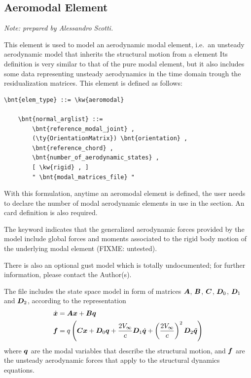 \subsection{Aeromodal Element}
\emph{Note: prepared by Alessandro Scotti.}

\noindent
This element is used to model an aerodynamic modal element,
i.e.\ an unsteady aerodynamic model that inherits the structural 
motion from a   element
Its definition is very similar to that of the pure modal element, 
but it also includes some data representing unsteady aerodynamics 
in the time domain trough the residualization matrices.
This element is defined as follows:
\begin{Verbatim}[commandchars=\\\{\}]
    \bnt{elem_type} ::= \kw{aeromodal}

    \bnt{normal_arglist} ::= 
        \bnt{reference_modal_joint} ,
        (\ty{OrientationMatrix}) \bnt{orientation} ,
        \bnt{reference_chord} ,
        \bnt{number_of_aerodynamic_states} ,
        [ \kw{rigid} , ]
        " \bnt{modal_matrices_file} "
\end{Verbatim}
With this formulation, anytime an aeromodal element is defined, 
the user needs to declare the number of modal aerodynamic elements 
in use in the  section.
An 
card definition is also required.

The keyword  indicates that the generalized aerodynamic forces
provided by the model include global forces and moments associated 
to the rigid body motion of the underlying modal element (FIXME: untested).

There is also an optional gust model which is totally undocumented;
for further information, please contact the Author(s).

The  file includes the state space model in form 
of matrices $\boldsymbol{A}$, $\boldsymbol{B}$, $\boldsymbol{C}$, $\boldsymbol{D}_0$, $\boldsymbol{D}_1$ and $\boldsymbol{D}_2$,
according to the representation
\begin{align*}
	\dot{\boldsymbol{x}} &= \boldsymbol{A}\boldsymbol{x} + \boldsymbol{B}\boldsymbol{q} \\	
	\boldsymbol{f} &= q\left( \boldsymbol{C}\boldsymbol{x} + \boldsymbol{D}_0 \boldsymbol{q} + \frac{2V_{\infty}}{c} \boldsymbol{D}_1 \dot{\boldsymbol{q}} + \left( \frac{2V_{\infty}}{c} \right)^2 \boldsymbol{D}_2 \ddot{\boldsymbol{q}} \right)
\end{align*}
where $\boldsymbol{q}$ are the modal variables that describe the structural motion,
and $\boldsymbol{f}$ are the unsteady aerodynamic forces that apply to the structural
dynamics equations.

